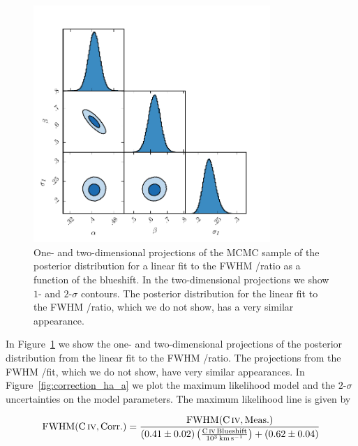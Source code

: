 \begin{figure}[h!]
    \centering
    \includegraphics[width=0.8\textwidth]{figures/chapter03/civ_ha_mcmc_parameters.pdf} 
    \caption[{Projections of the MCMC sample of the posterior distribution for a linear fit to the FWHM /\ha ratio as a function of the  blueshift.}]{One- and two-dimensional projections of the MCMC sample of the posterior distribution for a linear fit to the FWHM /\ha ratio as a function of the  blueshift. In the two-dimensional projections we show $1$- and $2$-$\sigma$ contours. The posterior distribution for the linear fit to the FWHM /\hb ratio, which we do not show, has a very similar appearance.} 
    \label{fig:mcmc_parameters}
\end{figure}

In Figure~\ref{fig:mcmc_parameters} we show the one- and two-dimensional projections of the posterior distribution from the linear fit to the FWHM /\ha ratio. 
The projections from the FWHM /\hb fit, which we do not show, have very similar appearances.
In Figure~\ref{fig:correction_ha_a} we plot the maximum likelihood model and the $2$-$\sigma$ uncertainties on the model parameters. 
The maximum likelihood line is given by  

\begingroup\makeatletter{}\check@mathfonts
\begin{eqnarray}
    \label{eq:hafwhm}
    \text{FWHM}(\text{C}\,\textsc{iv}, \text{Corr.}) = \frac{\text{FWHM}(\text{C}\,\textsc{iv}, \text{Meas.})}{ (0.41\pm0.02) \left(\frac{\text{C}\,\textsc{iv}\, \text{Blueshift}}{10^3 \,\text{km}\,\text{s}^{-1}} \right) + (0.62\pm0.04)}
\end{eqnarray}
\endgroup

